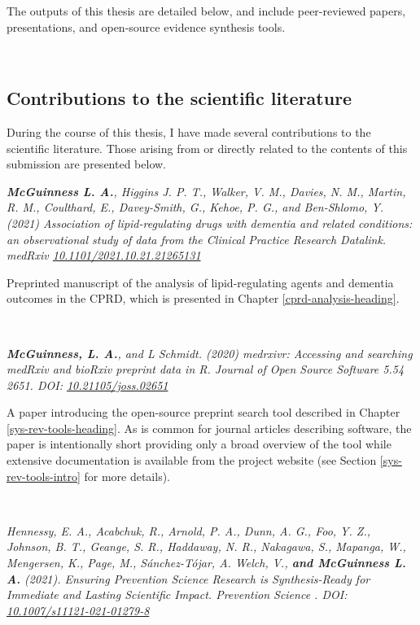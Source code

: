 \documentclass[a4paper, twoside]{templates/ociamthesis}
\begin{document}
The outputs of this thesis are detailed below, and include peer-reviewed papers, presentations, and open-source evidence synthesis tools.

~

\hypertarget{literature-contributions}{%
\subsection{Contributions to the scientific literature}\label{literature-contributions}}

During the course of this thesis, I have made several contributions to the scientific literature. Those arising from or directly related to the contents of this submission are presented below.

\emph{\textbf{McGuinness L. A.}, Higgins J. P. T., Walker, V. M., Davies, N. M., Martin, R. M., Coulthard, E., Davey-Smith, G., Kehoe, P. G., and Ben-Shlomo, Y. (2021) Association of lipid-regulating drugs with dementia and related conditions: an observational study of data from the Clinical Practice Research Datalink. medRxiv \href{https://doi.org/10.1101/2021.10.21.21265131}{10.1101/2021.10.21.21265131}}

Preprinted manuscript of the analysis of lipid-regulating agents and dementia outcomes in the CPRD, which is presented in Chapter \ref{cprd-analysis-heading}.

~

\emph{\textbf{McGuinness, L. A.}, and L Schmidt. (2020) medrxivr: Accessing and searching medRxiv and bioRxiv preprint data in R. Journal of Open Source Software 5.54 2651. DOI: \href{https://doi.org/10.21105/joss.02651}{10.21105/joss.02651}}

A paper introducing the open-source preprint search tool described in Chapter \ref{sys-rev-tools-heading}. As is common for journal articles describing software, the paper is intentionally short providing only a broad overview of the tool while extensive documentation is available from the project website (see Section \ref{sys-rev-tools-intro} for more details).

~

\emph{Hennessy, E. A., Acabchuk, R., Arnold, P. A., Dunn, A. G., Foo, Y. Z., Johnson, B. T., Geange, S. R., Haddaway, N. R., Nakagawa, S., Mapanga, W., Mengersen, K., Page, M., Sánchez-Tójar, A. Welch, V., \textbf{and McGuinness L. A.} (2021). Ensuring Prevention Science Research is Synthesis-Ready for Immediate and Lasting Scientific Impact. Prevention Science . DOI: \href{https://doi.org/10.1007/s11121-021-01279-8}{10.1007/s11121-021-01279-8}}
\end{document}
